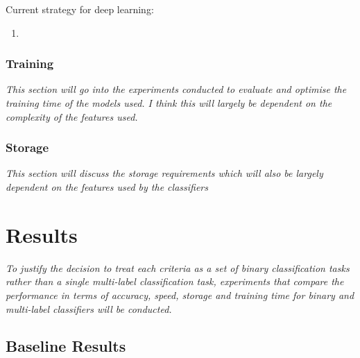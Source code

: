 \documentclass[a4paper,twoside,phd]{BYUPhys}
\begin{document}
Current strategy for deep learning:
\begin{enumerate}[-]
	\item 
\end{enumerate}

\subsection{Training}
\label{sec:TrainingExperiments}
\textit{This section will go into the experiments conducted to evaluate and optimise the training time of the models used. I think this will largely be dependent on the complexity of the features used.}

\subsection{Storage}
\label{sec:StorageExperiments}
\textit{This section will discuss the storage requirements which will also be largely dependent on the features used by the classifiers}



\chapter{Results}
\label{chap:Results}

\textit{To justify the decision to treat each criteria as a set of binary classification tasks rather than a single multi-label classification task, experiments that compare the performance in terms of accuracy, speed, storage and training time for binary and multi-label classifiers will be conducted.}

\section{Baseline Results}
\end{document}
